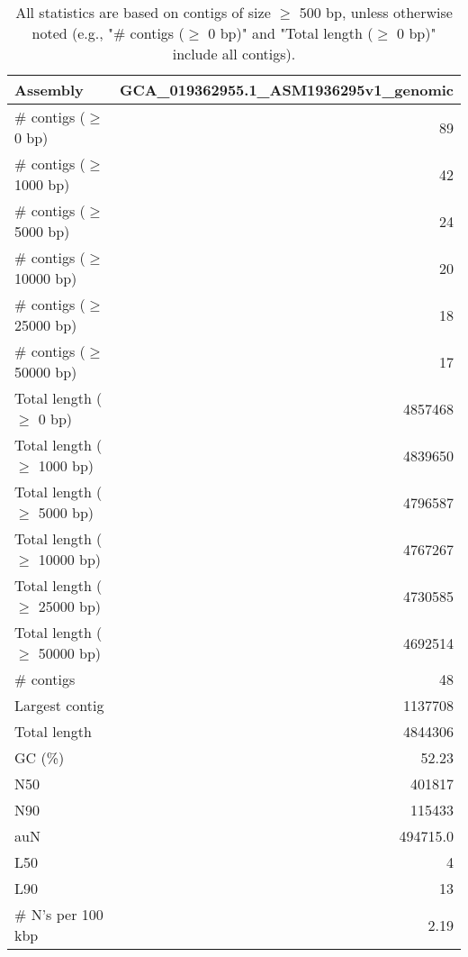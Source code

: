 \documentclass[12pt,a4paper]{article}
\begin{document}
\begin{table}[ht]
\begin{center}
\caption{All statistics are based on contigs of size $\geq$ 500 bp, unless otherwise noted (e.g., "\# contigs ($\geq$ 0 bp)" and "Total length ($\geq$ 0 bp)" include all contigs).}
\begin{tabular}{|l*{1}{|r}|}
\hline
Assembly & GCA\_019362955.1\_ASM1936295v1\_genomic \\ \hline
\# contigs ($\geq$ 0 bp) & 89 \\ \hline
\# contigs ($\geq$ 1000 bp) & 42 \\ \hline
\# contigs ($\geq$ 5000 bp) & 24 \\ \hline
\# contigs ($\geq$ 10000 bp) & 20 \\ \hline
\# contigs ($\geq$ 25000 bp) & 18 \\ \hline
\# contigs ($\geq$ 50000 bp) & 17 \\ \hline
Total length ($\geq$ 0 bp) & 4857468 \\ \hline
Total length ($\geq$ 1000 bp) & 4839650 \\ \hline
Total length ($\geq$ 5000 bp) & 4796587 \\ \hline
Total length ($\geq$ 10000 bp) & 4767267 \\ \hline
Total length ($\geq$ 25000 bp) & 4730585 \\ \hline
Total length ($\geq$ 50000 bp) & 4692514 \\ \hline
\# contigs & 48 \\ \hline
Largest contig & 1137708 \\ \hline
Total length & 4844306 \\ \hline
GC (\%) & 52.23 \\ \hline
N50 & 401817 \\ \hline
N90 & 115433 \\ \hline
auN & 494715.0 \\ \hline
L50 & 4 \\ \hline
L90 & 13 \\ \hline
\# N's per 100 kbp & 2.19 \\ \hline
\end{tabular}
\end{center}
\end{table}
\end{document}
